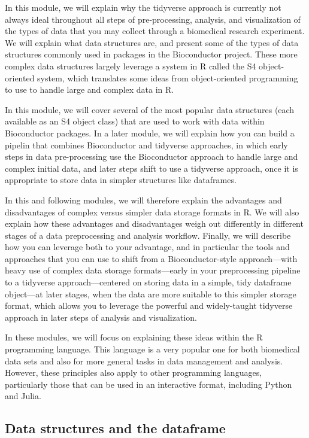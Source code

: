 \documentclass[]{tufte-book}
\begin{document}
In this module, we will explain why the tidyverse approach is currently not
always ideal throughout all steps of pre-processing, analysis, and visualization
of the types of data that you may collect through a biomedical research
experiment. We will explain what data structures are, and present some of the
types of data structures commonly used in packages in the Bioconductor project.
These more complex data structures largely leverage a system in R called the S4
object-oriented system, which translates some ideas from object-oriented
programming to use to handle large and complex data in R.

In this module, we will cover several of the most popular data structures (each
available as an S4 object class) that are used to work with data within
Bioconductor packages. In a later module, we will explain how you can build a
pipelin that combines Bioconductor and tidyverse approaches, in which early
steps in data pre-processing use the Bioconductor approach to handle large and
complex initial data, and later steps shift to use a tidyverse approach, once it
is appropriate to store data in simpler structures like dataframes.

In this
and following modules, we will therefore explain the advantages and disadvantages of
complex versus simpler data storage formats in R. We will also explain how these
advantages and disadvantages weigh out differently in different stages of a data
preprocessing and analysis workflow. Finally, we will describe how you can
leverage both to your advantage, and in particular the tools and approaches that
you can use to shift from a Bioconductor-style approach---with heavy use of
complex data storage formats---early in your preprocessing pipeline to a
tidyverse approach---centered on storing data in a simple, tidy dataframe
object---at later stages, when the data are more suitable to this simpler
storage format, which allows you to leverage the powerful and widely-taught
tidyverse approach in later steps of analysis and visualization.

In these modules, we will focus on explaining these ideas within the R
programming language. This language is a very popular one for both biomedical
data sets and also for more general tasks in data management and analysis.
However, these principles also apply to other programming languages,
particularly those that can be used in an interactive format, including Python
and Julia.

\hypertarget{data-structures-and-the-dataframe}{%
\subsection{Data structures and the dataframe}\label{data-structures-and-the-dataframe}}
\end{document}
